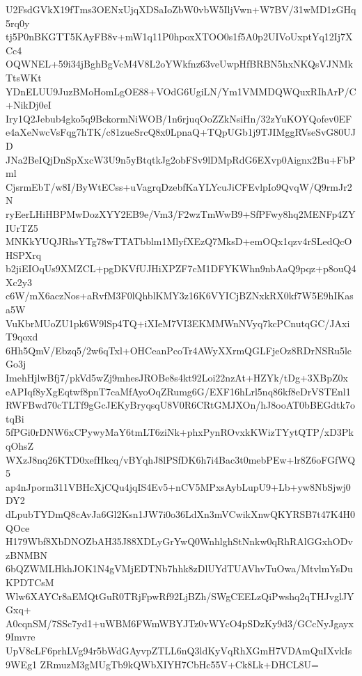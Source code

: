 U2FsdGVkX19fTms3OENxUjqXDSaIoZbW0vbW5IljVwn+W7BV/31wMD1zGHq5rq0y
tj5P0nBKGTT5KAyFB8v+mW1q11P0hpoxXTOO0s1f5A0p2UIVoUxptYq12Ij7XCc4
OQWNEL+59i34jBghBgVcM4V8L2oYWkfnz63veUwpHfBRBN5hxNKQsVJNMkTtsWKt
YDnELUU9JuzBMoHomLgOE88+VOdG6UgiLN/Ym1VMMDQWQuxRIhArP/C+NikDj0eI
Iry1Q2Jebub4gko5q9BckormNiWOB/1n6rjuqOoZZkNsiHn/32zYuKOYQofev0EF
e4aXeNwcVsFqg7hTK/c81zueSrcQ8x0LpnaQ+TQpUGb1j9TJIMggRVseSvG80UJD
JNa2BeIQjDnSpXxcW3U9n5yBtqtkJg2obFSv9lDMpRdG6EXvp0Aignx2Bu+FbPml
CjsrmEbT/w8I/ByWtECss+uVagrqDzebfKaYLYcuJiCFEvlpIo9QvqW/Q9rmJr2N
ryEerLHiHBPMwDozXYY2EB9e/Vm3/F2wzTmWwB9+SfPFwy8hq2MENFp4ZYIUrTZ5
MNKkYUQJRhsYTg78wTTATbblm1MlyfXEzQ7MksD+emOQx1qzv4rSLedQcOHSPXrq
b2jiEIOqUs9XMZCL+pgDKVfUJHiXPZF7cM1DFYKWhn9nbAaQ9pqz+p8ouQ4Xc2y3
c6W/mX6aczNos+aRvfM3F0lQhblKMY3z16K6VYICjBZNxkRX0kf7W5E9hIKasa5W
VuKbrMUoZU1pk6W9lSp4TQ+iXIeM7VI3EKMMWnNVyq7kcPCnutqGC/JAxiT9qoxd
6Hh5QmV/Ebzq5/2w6qTxl+OHCeanPcoTr4AWyXXrmQGLFjeOz8RDrNSRu5lcGo3j
ImehHjlwBfj7/pkVd5wZj9mhesJROBe8s4kt92Loi22nzAt+HZYk/tDg+3XBpZ0x
eAPIqf8yXgEqtwf8pnT7caMfAyoOqZRumg6G/EXF16hLrl5nq86kf8eDrVSTEnl1
RWFBwd70cTLTf9gGcJEKyBryqsqU8V0R6CRtGMJXOn/hJ8ooAT0bBEGdtk7otqBi
5fPGi0rDNW6xCPywyMaY6tmLT6ziNk+phxPynROvxkKWizTYytQTP/xD3PkqOhsZ
WXzJ8nq26KTD0xefHkcq/vBYqhJ8lPSfDK6h7i4Bac3t0mebPEw+lr8Z6oFGfWQ5
ap4nJporm311VBHcXjCQu4jqIS4Ev5+nCV5MPxsAybLupU9+Lb+yw8NbSjwj0DY2
dLpubTYDmQ8cAvJa6Gl2Ksn1JW7i0o36LdXn3mVCwikXnwQKYRSB7t47K4H0QOce
H179Wbf8XbDNOZbAH35J88XDLyGrYwQ0WnhlghStNnkw0qRhRAlGGxhODvzBNMBN
6bQZWMLHkhJOK1N4gVMjEDTNb7hhk8zDlUYdTUAVhvTuOwa/MtvlmYsDuKPDTCsM
Wlw6XAYCr8aEMQtGuR0TRjFpwRf92LjBZh/SWgCEELzQiPwshq2qTHJvglJYGxq+
A0cqnSM/7SSc7yd1+uWBM6FWmWBYJTz0vWYcO4pSDzKy9d3/GCcNyJgayx9Imvre
UpV8cLF6prhLVg94r5bWdGAyvpZTLL6nQ3ldKyVqRhXGmH7VDAmQuIXvkIs9WEg1
ZRmuzM3gMUgTb9kQWbXIYH7CbHc55V+Ck8Lk+DHCL8U=
